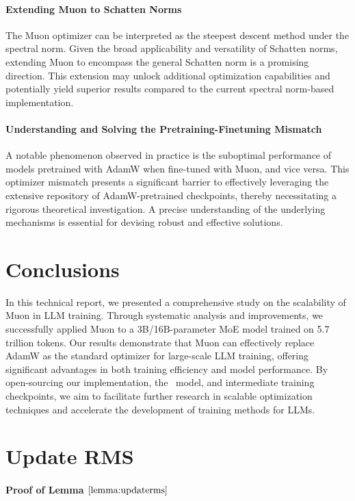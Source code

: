 \paragraph{Extending Muon to Schatten Norms}
The Muon optimizer can be interpreted as the steepest descent method under the spectral norm. Given the broad applicability and versatility of Schatten norms, extending Muon to encompass the general Schatten norm is a promising direction. This extension may unlock additional optimization capabilities and potentially yield superior results compared to the current spectral norm-based implementation.

\paragraph{Understanding and Solving the Pretraining-Finetuning Mismatch}
A notable phenomenon observed in practice is the suboptimal performance of models pretrained with AdamW when fine-tuned with Muon, and vice versa. This optimizer mismatch presents a significant barrier to effectively leveraging the extensive repository of AdamW-pretrained checkpoints, thereby necessitating a rigorous theoretical investigation. A precise understanding of the underlying mechanisms is essential for devising robust and effective solutions.


\section{Conclusions}
In this technical report, we presented a comprehensive study on the scalability of Muon in LLM training. Through systematic analysis and improvements, we successfully applied Muon to a 3B/16B-parameter MoE model trained on 5.7 trillion tokens. Our results demonstrate that Muon can effectively replace AdamW as the standard optimizer for large-scale LLM training, offering significant advantages in both training efficiency and model performance. By open-sourcing our implementation, the \ours~model, and intermediate training checkpoints, we aim to facilitate further research in scalable optimization techniques and accelerate the development of training methods for LLMs.

\section{Update RMS}
\label{sec:appendix:updaterms}

\paragraph{Proof of Lemma $\ref{lemma:updaterms}$}

